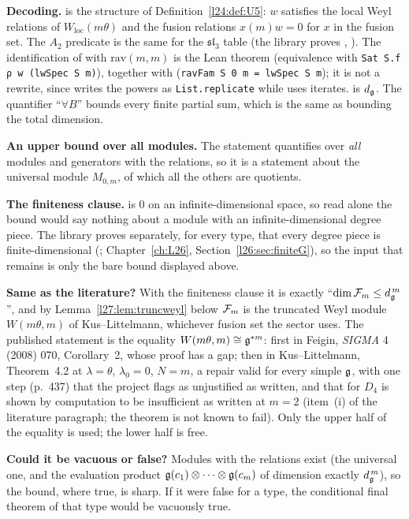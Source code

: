 \begin{dictionary}
\textbf{Decoding.}  is the structure of Definition~\ref{l24:def:U5}: $w$ satisfies the local Weyl
relations of $W_{\mathrm{loc}}(m\theta)$ and the fusion relations $x(m)w=0$ for $x$ in the fusion set. The $A_2$ predicate
 is the same for the $\mathfrak{sl}_3$ table (the library proves
, ). The identification of  with $\mathrm{rav}(m,m)$ is the Lean theorem  (equivalence with \texttt{Sat S.f ρ w (lwSpec S m)}), together with  (\texttt{ravFam S 0 m = lwSpec S m}); it is not a rewrite, since  writes the powers as \texttt{List.replicate} while  uses iterates.  is $d_{\mathfrak g}$. The quantifier ``$\forall B$''
bounds every finite partial sum, which is the same as bounding the total dimension.

\textbf{An upper bound over all modules.} The statement quantifies over \emph{all} modules and generators with the
relations, so it is a statement about the universal module $M_{0,m}$, of which all the others are quotients.

\textbf{The finiteness clause.}  is $0$ on an infinite-dimensional space, so read alone the bound would
say nothing about a module with an infinite-dimensional degree piece. The library proves separately, for every type, that
every degree piece is finite-dimensional (; Chapter~\ref{ch:L26},
Section~\ref{l26:sec:finiteG}), so the input that remains is only the bare bound displayed above.

\textbf{Same as the literature?} With the finiteness clause it is exactly ``$\dim\mathcal F_m\le d_{\mathfrak g}^{\,m}$'',
and by Lemma~\ref{l27:lem:truncweyl} below $\mathcal F_m$ is the truncated Weyl module $W(m\theta,m)$ of Kus--Littelmann,
whichever fusion set the sector uses. The published statement is the equality $W(m\theta,m)\cong\mathfrak g^{*m}$:
first in Feigin, \emph{SIGMA} 4 (2008) 070, Corollary~2, whose proof has a gap; then in Kus--Littelmann, Theorem~4.2 at
$\lambda=\theta$, $\lambda_0=0$, $N=m$, a repair valid for every simple $\mathfrak g$, with one step (p.~437) that the
project flags as unjustified as written, and that for $D_4$ is shown by computation to be insufficient as written at $m=2$
(item~(i) of the literature paragraph; the theorem is not known to fail). Only the upper half of the equality is used;
the lower half is free.

\textbf{Could it be vacuous or false?} Modules with the relations exist (the universal one, and the evaluation product
$\mathfrak g(c_1)\otimes\dots\otimes\mathfrak g(c_m)$ of dimension exactly $d_{\mathfrak g}^{\,m}$), so the bound, where true, is sharp.
If it were false for a type, the conditional final theorem of that type would be vacuously true.
\end{dictionary}

